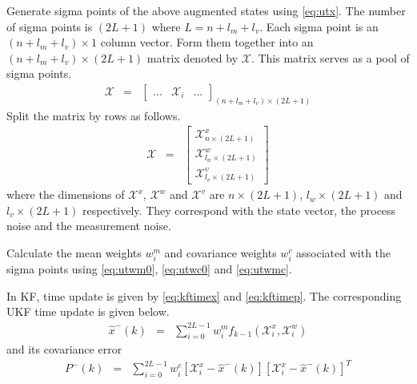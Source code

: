 Generate sigma points of the above augmented states using \eqref{eq:utx}. The number of sigma points is $(2L+1)$ where $L = n+l_m+l_v$. Each sigma point is an $(n+l_m+l_v)\times 1$ column vector. Form them together into an $(n+l_m+l_v)\times (2L+1)$ matrix denoted by $\mathcal{X}$. This matrix serves as a pool of sigma points. 
\begin{eqnarray}
	\mathcal{X} &=& \left[\begin{array}{ccc}
		\ldots & \mathcal{X}_i & \ldots
	\end{array}\right]_{(n+l_m+l_v)\times (2L+1)} \label{eq:ukfsigmapoint1}
\end{eqnarray}
Split the matrix by rows as follows.
\begin{eqnarray}
	\mathcal{X} &=&\left[\begin{array}{c}
		\mathcal{X}_{n \times (2L+1)}^x \\
		\mathcal{X}_{l_w \times (2L+1)}^w \\
		\mathcal{X}_{l_v \times (2L+1)}^v
	\end{array}\right] \label{eq:ukfsigmapoint2}
\end{eqnarray}
where the dimensions of $\mathcal{X}^x$, $\mathcal{X}^w$ and $\mathcal{X}^v$ are $n \times (2L+1)$, $l_w \times (2L+1)$ and $l_v \times (2L+1)$ respectively. They correspond with the state vector, the process noise and the measurement noise. 

Calculate the mean weights $w_i^m$ and covariance weights $w_i^c$ associated with the sigma points using \eqref{eq:utwm0}, \eqref{eq:utwc0} and \eqref{eq:utwmc}.

In KF, time update is given by \eqref{eq:kftimex} and \eqref{eq:kftimep}. The corresponding UKF time update is given below. 
\begin{eqnarray}
	\hat{x}^-(k) &=& \sum_{i=0}^{2L-1} w_i^m f_{k-1}\left(\mathcal{X}_i^x, \mathcal{X}_i^w\right)  \label{eq:ukftimex}
\end{eqnarray}
and its covariance error
\begin{eqnarray}
	P^-(k) &=& \sum_{i=0}^{2L-1} w_i^c \left[\mathcal{X}_i^x -\hat{x}^-(k)\right]\left[\mathcal{X}_i^x -\hat{x}^-(k)\right]^T \label{eq:ukftimep}
\end{eqnarray}

